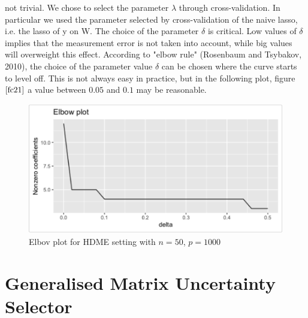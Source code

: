 \documentclass[a4paper,12pt,openany]{report}
\theoremstyle{plain}
\theoremstyle{plain}
\theoremstyle{plain}
\theoremstyle{plain}
\theoremstyle{plain}
\theoremstyle{plain}
\theoremstyle{plain}
\theoremstyle{plain}
\theoremstyle{plain}
\theoremstyle{plain}
\theoremstyle{plain}
\theoremstyle{plain}
\begin{document}
not trivial. We chose to select the parameter $\lambda$ through cross-validation. In particular we
used the parameter selected by cross-validation of the naive lasso, i.e. the lasso
of y on W.
The choice of the parameter $\delta$ is critical. Low values of $\delta$ implies that the measurement
error is not taken into account, while big values will overweight this effect. According to "elbow rule" (Rosenbaum and Tsybakov, 2010), the choice of the parameter value $\delta$ can be chosen where the curve starts to level off. This is not always easy in practice, but in the following plot, figure $\ref{fc21}$ a value between $0.05$ and $0.1$ may be reasonable.

\begin{figure}\label{fc21}
	\centering
	\includegraphics[width=0.9\linewidth]{F1ElbowPlot}
	\caption{Elbov plot for HDME setting with $n=50$, $p=1000$}
\end{figure}

\section{Generalised Matrix Uncertainty Selector}
\end{document}
